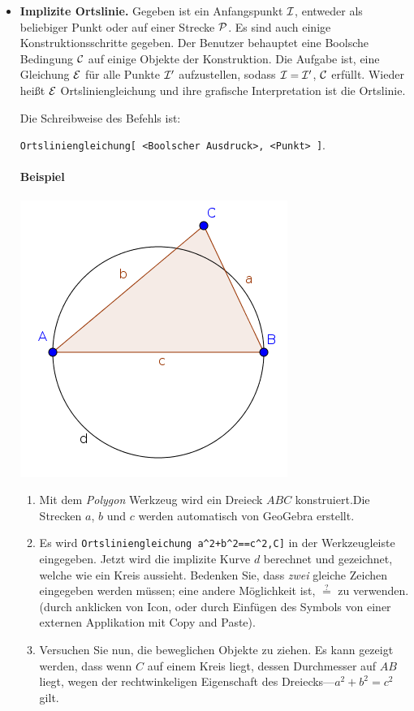 \documentclass{article}
\begin{document}
\begin{itemize}
\item \textbf{Implizite Ortslinie.}
Gegeben ist ein Anfangspunkt $\cal I$, entweder als beliebiger Punkt oder auf einer Strecke $\cal P$. Es sind auch einige Konstruktionsschritte gegeben. Der Benutzer behauptet eine Boolsche Bedingung $\cal C$ auf einige Objekte der Konstruktion. Die Aufgabe ist, eine Gleichung $\cal E$ für alle Punkte $\cal{I}'$ aufzustellen, sodass $\cal{I}=\cal{I}'$,  $\cal{C}$ erfüllt. Wieder heißt  $\cal{E}$ Ortsliniengleichung und ihre grafische Interpretation ist die Ortslinie.

Die Schreibweise des Befehls ist:
\begin{center}
    \texttt{Ortsliniengleichung[ <Boolscher Ausdruck>, <Punkt> ]}.
\end{center}


\paragraph{Beispiel}
\begin{center}
\includegraphics[scale=0.5]{LocusEquation-example-implicit}
\end{center}
\begin{enumerate}
    \item Mit dem \textit{Polygon} Werkzeug wird ein Dreieck $ABC$ konstruiert.Die Strecken $a$, $b$ und $c$ werden automatisch von GeoGebra erstellt.
    \item Es wird \texttt{Ortsliniengleichung a\^{}2+b\^{}2==c\^{}2,C]} in der Werkzeugleiste eingegeben. Jetzt wird die implizite Kurve $d$ berechnet und gezeichnet, welche wie ein Kreis aussieht.
    Bedenken Sie, dass \textit{zwei} gleiche Zeichen eingegeben werden müssen; eine andere Möglichkeit ist, $\stackrel{?}{=}$ zu verwenden. (durch anklicken von \framebox{$\alpha$} Icon, oder durch Einfügen des Symbols von einer externen Applikation mit Copy and Paste).
    \item Versuchen Sie nun, die beweglichen Objekte zu ziehen. Es kann gezeigt werden, dass wenn $C$ auf einem Kreis liegt, dessen Durchmesser auf $AB$ liegt, wegen der rechtwinkeligen Eigenschaft des Dreiecks---$a^2+b^2=c^2$ gilt.
\end{enumerate}

\end{itemize}
\end{document}
